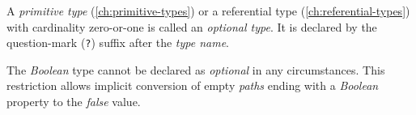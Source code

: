 A \emph{primitive type} (\ref{ch:primitive-types})
or a referential type (\ref{ch:referential-types})
with cardinality zero-or-one is called an \emph{optional type}.
It is declared by the question-mark (\verb|?|) suffix
after the \emph{type name}.

The \emph{Boolean} type cannot be declared as \emph{optional} in any circumstances.
This restriction allows implicit conversion of empty \emph{paths}
ending with a \emph{Boolean} property to the \emph{false} value.
